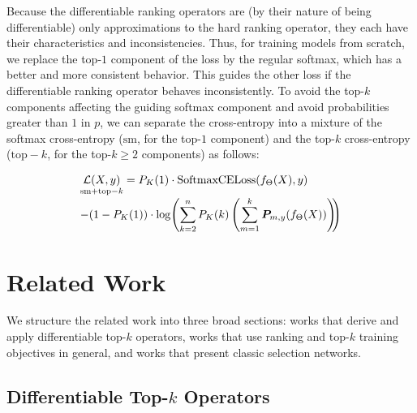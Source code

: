 \documentclass{article}
\def\mP{{\bm{P}}}
\begin{document}
Because the differentiable ranking operators are (by their nature of being differentiable) only approximations to the hard ranking operator, they each have their characteristics and inconsistencies.
Thus, for training models from scratch, we replace the top-$1$ component of the loss by the regular softmax, which has a better and more consistent behavior.
This guides the other loss if the differentiable ranking operator behaves inconsistently.
To avoid the top-$k$ components affecting the guiding softmax component and avoid probabilities greater than $1$ in $p$, we can separate the cross-entropy into a mixture of the softmax cross-entropy ($\mathrm{sm}$, for the top-$1$ component) and the top-$k$ cross-entropy ($\mathrm{top}-k$, for the top-$k\geq2$ components) as follows: 

\begin{align}
    &\underset{\mathrm{sm+top-}k}{\mathcal{L}(X, y)}
    = P_K(1) \cdot  \operatorname{SoftmaxCELoss}(f_\Theta (X), y) \\[-0.7ex]
    &{-} (1-P_K(1)) \cdot \log\!\left( \sum_{k=2}^n P_K(k) \left(\sum_{m=1}^k \mP_{m, y}(f_\Theta (X)) \right)\!\!\right) \notag \end{align}





























\section{Related Work}

We structure the related work into three broad sections: works that derive and apply differentiable top-$k$ operators, works that use ranking and top-$k$ training objectives in general, and works that present classic selection networks.


\subsection{Differentiable Top-$k$ Operators}
\end{document}
